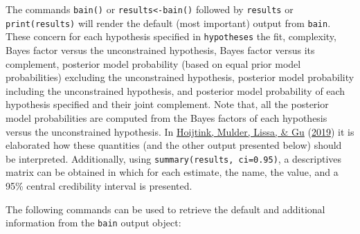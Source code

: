 \documentclass[
]{book}
\begin{document}
The commands \texttt{bain()} or \texttt{results\textless{}-bain()} followed by
\texttt{results} or \texttt{print(results)} will render the default (most
important) output from \texttt{bain}. These concern for each hypothesis
specified in \texttt{hypotheses} the fit, complexity, Bayes factor versus
the unconstrained hypothesis, Bayes factor versus its
complement, posterior model probability (based on equal prior model
probabilities) excluding the unconstrained hypothesis, posterior model
probability including the unconstrained hypothesis, and posterior model
probability of each hypothesis specified and their joint complement.
Note that, all the posterior model probabilities are computed from
the Bayes factors of each hypothesis versus the unconstrained hypothesis.
In \protect\hyperlink{ref-hoijtink2019tutorial}{Hoijtink, Mulder, Lissa, \& Gu} (\protect\hyperlink{ref-hoijtink2019tutorial}{2019}) it is elaborated how these quantities
(and the other
output presented below) should be interpreted. Additionally, using
\texttt{summary(results,\ ci=0.95)}, a descriptives matrix can be obtained
in which for each estimate, the name, the value, and a 95\% central
credibility interval is presented.

The following commands can be used to
retrieve the default and additional information from the \texttt{bain} output
object:
\end{document}
